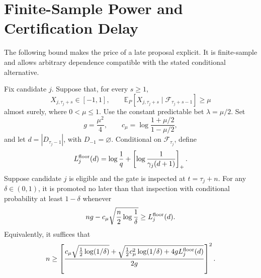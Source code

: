 \section{Finite-Sample Power and Certification Delay}
\label{app:power}

The following bound makes the price of a late proposal explicit.  It is
finite-sample and allows arbitrary dependence compatible with the stated
conditional alternative.

\begin{proposition}
\label{prop:app-power}
Fix candidate \(j\).  Suppose that, for every \(s\geq1\),
\begin{equation}
 X_{j,\tau_j+s}\in[-1,1],
 \qquad
 \mathbb E_P[X_{j,\tau_j+s}\mid
              \mathcal F_{\tau_j+s-1}]\geq\mu
 \label{eq:app-alt}
\end{equation}
almost surely, where \(0<\mu\leq1\).  Use the constant predictable bet
\(\lambda=\mu/2\).  Set
\[
 g=\frac{\mu^2}{4},\qquad
 c_\mu=\log\frac{1+\mu/2}{1-\mu/2},
\]
and let \(d=|D_{\tau_j-1}|\), with \(D_{-1}=\varnothing\).  Conditional on
\(\mathcal F_{\tau_j}\), define
\begin{equation}
 L_j^{\rm floor}(d)
 =\log\frac1q+
  \left[\log\frac{1}{\gamma_j(d+1)}\right]_+.
 \label{eq:app-floor-delay-boundary}
\end{equation}
Suppose candidate \(j\) is eligible and the gate is inspected at
\(t=\tau_j+n\).  For any \(\delta\in(0,1)\), it is promoted no later than
that inspection with conditional probability at least \(1-\delta\) whenever
\begin{equation}
 ng-c_\mu\sqrt{\frac n2\log\frac1\delta}\geq L_j^{\rm floor}(d).
 \label{eq:app-delay-implicit}
\end{equation}
Equivalently, it suffices that
\begin{equation}
 n\geq
 \left[
 \frac{
 c_\mu\sqrt{\tfrac12\log(1/\delta)}
 +\sqrt{\tfrac12c_\mu^2\log(1/\delta)+4gL_j^{\rm floor}(d)}
 }{2g}
 \right]^2.
 \label{eq:app-delay-explicit}
\end{equation}
\end{proposition}


